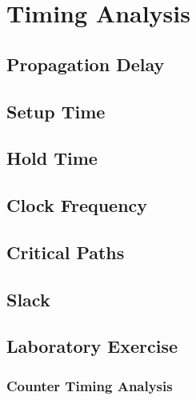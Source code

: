 \chapter{Timing Analysis}

\section{Propagation Delay}

\section{Setup Time}

\section{Hold Time}

\section{Clock Frequency}

\section{Critical Paths}

\section{Slack}

\section{Laboratory Exercise}

\subsection*{Counter Timing Analysis}
